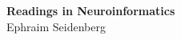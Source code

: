\documentclass[11pt, english]{article}
\begin{document}
\begin{center}


	\Large{%
	\bfseries Readings in Neuroinformatics} \\[1cm] 



	\Large{ Ephraim Seidenberg}\\[0.1cm]
	
	\vfill

\end{center}

\vspace{1cm}



\nocite{enroth1966contrast}
\end{document}
